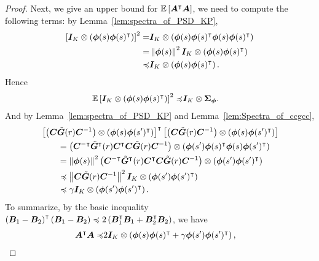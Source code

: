 \begin{proof}
Next, we give an upper bound for ${\mathbb E}\left[{{\bm{A}}^{\intercal}{\bm{A}}}\right]$, we need to compute the following terms: by Lemma~\ref{lem:spectra_of_PSD_KP},
\begin{equation}\label{eq:ctc_phiphi_2_bound}
\begin{aligned}
   \left[{{\bm{I}}_K\otimes\left({{\bm{\phi}}(s){\bm{\phi}}(s)^{\intercal}}\right)}\right]^2=&{\bm{I}}_K\otimes\left({{\bm{\phi}}(s){\bm{\phi}}(s)^{\intercal}{\bm{\phi}}(s){\bm{\phi}}(s)^{\intercal}}\right)\\
   =&\left\|{{\bm{\phi}}(s)}\right\|^2{\bm{I}}_K\otimes\left({{\bm{\phi}}(s){\bm{\phi}}(s)^{\intercal}}\right)\\
   \preccurlyeq&{\bm{I}}_K\otimes\left({{\bm{\phi}}(s){\bm{\phi}}(s)^{\intercal}}\right).
\end{aligned}
\end{equation}
Hence
\begin{equation*}
\begin{aligned}
   {\mathbb E}\left[{{\bm{I}}_K\otimes\left({{\bm{\phi}}(s){\bm{\phi}}(s)^{\intercal}}\right)}\right]^2\preccurlyeq&{\bm{I}}_K\otimes{\bm{\Sigma}}_{{\bm{\phi}}}.
\end{aligned}
\end{equation*}
And by Lemma~\ref{lem:spectra_of_PSD_KP} and Lemma~\ref{lem:Spectra_of_ccgcc},
\begin{equation*}
\begin{aligned}
   &\left[{\left({{\bm{C}}\tilde{{\bm{G}}}(r){\bm{C}}^{-1}}\right)\otimes\left({{\bm{\phi}}(s){\bm{\phi}}(s^\prime)^{\intercal}}\right)}\right]^{\intercal}\left[{\left({{\bm{C}}\tilde{{\bm{G}}}(r){\bm{C}}^{-1}}\right)\otimes\left({{\bm{\phi}}(s){\bm{\phi}}(s^\prime)^{\intercal}}\right)}\right]\\
   &\qquad =\left({{\bm{C}}^{-\intercal}\tilde{{\bm{G}}}^{\intercal}(r){\bm{C}}^{\intercal}{\bm{C}}\tilde{{\bm{G}}}(r){\bm{C}}^{-1}}\right)\otimes\left({{\bm{\phi}}(s^\prime){\bm{\phi}}(s)^{\intercal}{\bm{\phi}}(s){\bm{\phi}}(s^\prime)^{\intercal}}\right)\\
   &\qquad =\left\|{{\bm{\phi}}(s)}\right\|^2\left({{\bm{C}}^{-\intercal}\tilde{{\bm{G}}}^{\intercal}(r){\bm{C}}^{\intercal}{\bm{C}}\tilde{{\bm{G}}}(r){\bm{C}}^{-1}}\right)\otimes\left({{\bm{\phi}}(s^\prime){\bm{\phi}}(s^\prime)^{\intercal}}\right)\\
   &\qquad \preccurlyeq \left\|{{\bm{C}}\tilde{{\bm{G}}}(r){\bm{C}}^{-1}}\right\|^2{\bm{I}}_K\otimes\left({{\bm{\phi}}(s^\prime){\bm{\phi}}(s^\prime)^{\intercal}}\right)\\
   &\qquad \preccurlyeq \gamma{\bm{I}}_K\otimes\left({{\bm{\phi}}(s^\prime){\bm{\phi}}(s^\prime)^{\intercal}}\right).
\end{aligned}
\end{equation*}
To summarize, by the basic inequality $\left({{\bm{B}}_1-{\bm{B}}_2}\right)^{\intercal}\left({{\bm{B}}_1-{\bm{B}}_2}\right)\preccurlyeq 2\left({{\bm{B}}_1^{\intercal}{\bm{B}}_1+{\bm{B}}_2^{\intercal}{\bm{B}}_2}\right)$, we have
\begin{equation}\label{eq:AAt_bound}
\begin{aligned}
    \bA^{\intercal}\bA\preccurlyeq&2\bI_K\otimes\prn{\bphi(s)\bphi(s)^{\intercal}+\gamma\bphi(s^\prime)\bphi(s^\prime)^{\intercal}},

\end{aligned}
\end{equation}
\end{proof}
